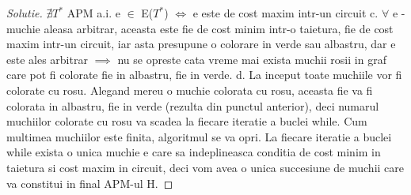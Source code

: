 \documentclass[12pt]{article}
\newenvironment{problema}[2][Problema]{\begin{trivlist}
\item[\hskip \labelsep {\bfseries #1}\hskip \labelsep {\bfseries #2.}]}{\end{trivlist}}
\begin{document}
\begin{proof}[Solutie]
\newline\newline
$\nexists T^*$ APM a.i. e $\in$ E($T^*$) $\Longleftrightarrow$ e este de cost maxim intr-un circuit
\newline\newline
c.
\newline
$\forall$ e - muchie aleasa arbitrar, aceasta este fie de cost minim intr-o taietura, fie de cost maxim intr-un circuit, iar asta presupune o colorare  in verde sau albastru, dar e este ales arbitrar $\implies$ nu se opreste cata vreme mai exista muchii rosii in graf care pot fi colorate fie in albastru, fie in verde.
\newline\newline
d.
\newline
La inceput toate muchiile vor fi colorate cu rosu. Alegand mereu o muchie colorata cu rosu, aceasta fie va fi colorata in albastru, fie in verde (rezulta din punctul anterior), deci numarul muchiilor colorate cu rosu va scadea la fiecare iteratie a buclei while. Cum multimea muchiilor este finita, algoritmul se va opri.
\newline\newline
La fiecare iteratie a buclei while exista o unica muchie e care sa indeplineasca conditia de cost minim in taietura si cost maxim in circuit, deci vom avea o unica succesiune de muchii care va constitui in final APM-ul H.

\end{proof}

\newpage

\begin{problema}{4}
\end{problema}
 
\end{document}
